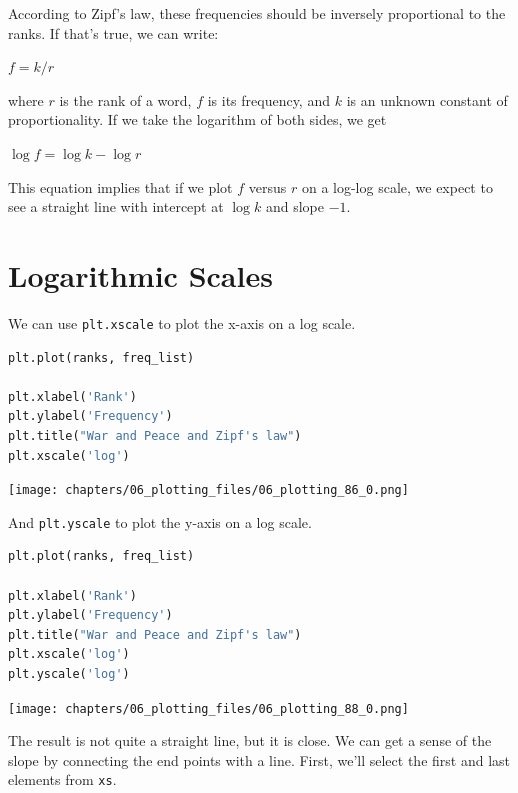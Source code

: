 According to Zipf's law, these frequencies should be inversely
proportional to the ranks. If that's true, we can write:

\(f = k / r\)

where \(r\) is the rank of a word, \(f\) is its frequency, and \(k\) is
an unknown constant of proportionality. If we take the logarithm of both
sides, we get

\(\log f = \log k - \log r\)

This equation implies that if we plot \(f\) versus \(r\) on a log-log
scale, we expect to see a straight line with intercept at \(\log k\) and
slope \(-1\).

\section{Logarithmic Scales}\label{logarithmic-scales}

We can use \passthrough{\lstinline!plt.xscale!} to plot the x-axis on a
log scale.

\begin{lstlisting}[language=Python,style=source]
plt.plot(ranks, freq_list)

plt.xlabel('Rank')
plt.ylabel('Frequency')
plt.title("War and Peace and Zipf's law")
plt.xscale('log')
\end{lstlisting}

\begin{center}
\texttt{[image: chapters/06\_plotting\_files/06\_plotting\_86\_0.png]}
\end{center}

And \passthrough{\lstinline!plt.yscale!} to plot the y-axis on a log
scale.

\begin{lstlisting}[language=Python,style=source]
plt.plot(ranks, freq_list)

plt.xlabel('Rank')
plt.ylabel('Frequency')
plt.title("War and Peace and Zipf's law")
plt.xscale('log')
plt.yscale('log')
\end{lstlisting}

\begin{center}
\texttt{[image: chapters/06\_plotting\_files/06\_plotting\_88\_0.png]}
\end{center}

The result is not quite a straight line, but it is close. We can get a
sense of the slope by connecting the end points with a line. First,
we'll select the first and last elements from
\passthrough{\lstinline!xs!}.


